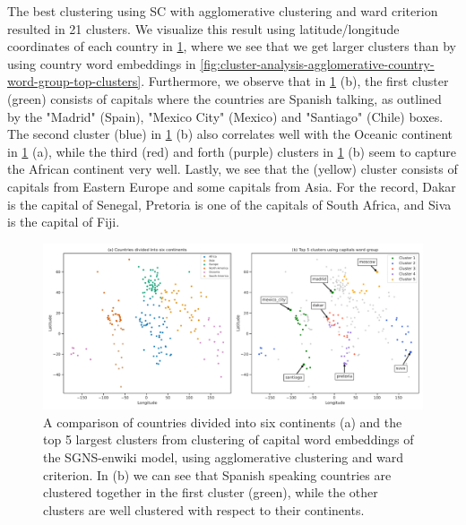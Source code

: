 The best clustering using SC with agglomerative clustering and ward criterion resulted in 21 clusters. We visualize this result using latitude/longitude coordinates of each country in \cref{fig:cluster-analysis-agglomerative-country-capitals-word-group-top-clusters}, where we see that we get larger clusters than by using country word embeddings in \cref{fig:cluster-analysis-agglomerative-country-word-group-top-clusters}. Furthermore, we observe that in \cref{fig:cluster-analysis-agglomerative-country-capitals-word-group-top-clusters} (b), the first cluster (green) consists of capitals where the countries are Spanish talking, as outlined by the "Madrid" (Spain), "Mexico City" (Mexico) and "Santiago" (Chile) boxes.
The second cluster (blue) in \cref{fig:cluster-analysis-agglomerative-country-capitals-word-group-top-clusters} (b) also correlates well with the Oceanic continent in \cref{fig:cluster-analysis-agglomerative-country-capitals-word-group-top-clusters} (a), while the third (red) and forth (purple) clusters in \cref{fig:cluster-analysis-agglomerative-country-capitals-word-group-top-clusters} (b) seem to capture the African continent very well. Lastly, we see that the (yellow) cluster consists of capitals from Eastern Europe and some capitals from Asia.
For the record, Dakar is the capital of Senegal, Pretoria is one of the capitals of South Africa, and Siva is the capital of Fiji.
\begin{figure}[H]
    \centering
    \includegraphics[width=\textwidth]{thesis/figures/cluster-analysis-agglomerative-country-capitals-word-group-top-clusters.pdf}
    \caption{A comparison of countries divided into six continents (a) and the top 5 largest clusters from clustering of capital word embeddings of the SGNS-enwiki model, using agglomerative clustering and ward criterion. In (b) we can see that Spanish speaking countries are clustered together in the first cluster (green), while the other clusters are well clustered with respect to their continents.}
    \label{fig:cluster-analysis-agglomerative-country-capitals-word-group-top-clusters}
\end{figure}

